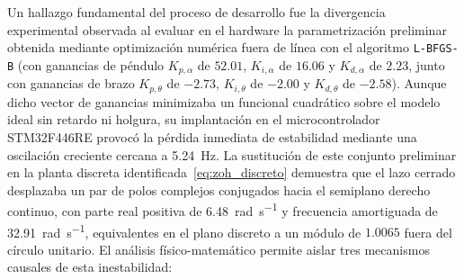 Un hallazgo fundamental del proceso de desarrollo fue la divergencia experimental observada al evaluar en el hardware la parametrización preliminar obtenida mediante optimización numérica fuera de línea con el algoritmo \texttt{L-BFGS-B} (con ganancias de péndulo $K_{p,\alpha}$ de $52.01$, $K_{i,\alpha}$ de $16.06$ y $K_{d,\alpha}$ de $2.23$, junto con ganancias de brazo $K_{p,\theta}$ de $-2.73$, $K_{i,\theta}$ de $-2.00$ y $K_{d,\theta}$ de $-2.58$). Aunque dicho vector de ganancias minimizaba un funcional cuadrático sobre el modelo ideal sin retardo ni holgura, su implantación en el microcontrolador STM32F446RE provocó la pérdida inmediata de estabilidad mediante una oscilación creciente cercana a \qty{5.24}{\hertz}. La sustitución de este conjunto preliminar en la planta discreta identificada~\eqref{eq:zoh_discreto} demuestra que el lazo cerrado desplazaba un par de polos complejos conjugados hacia el semiplano derecho continuo, con parte real positiva de \qty{+6.48}{\radian\per\second} y frecuencia amortiguada de \qty{32.91}{\radian\per\second}, equivalentes en el plano discreto a un módulo de $1.0065$ fuera del círculo unitario. El análisis físico-matemático permite aislar tres mecanismos causales de esta inestabilidad:

